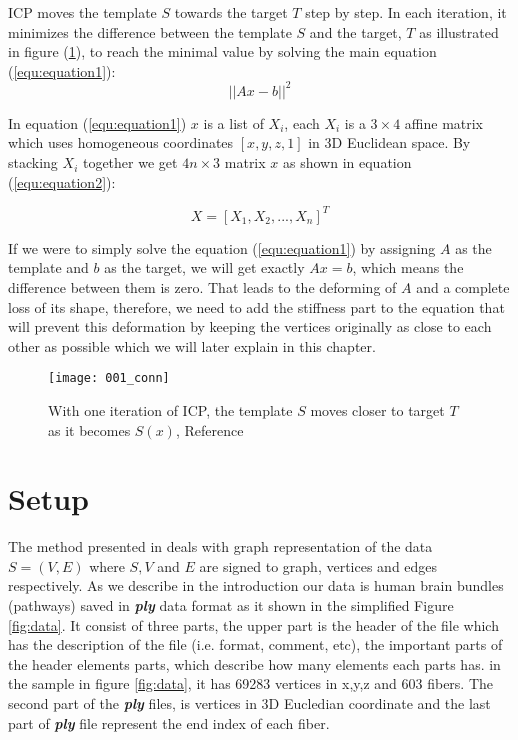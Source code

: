 \documentclass[../structure.tex]{subfiles}
\begin{document}
\hspace{2em}ICP moves the template $S$ towards the target $T$ step by step. In each iteration, it minimizes the difference between the template $S$ and the target, $T$ as illustrated in figure (\ref{fig:figure1}), to reach the minimal value by solving the main equation (\ref{equ:equation1}):
\begin{equation}
\label{equ:equation1}
||Ax-b||^2
\end{equation}

\hspace{2em}In equation (\ref{equ:equation1}) $x$ is a list of $X_i$, each $X_i$ is a $3\times4$ affine matrix which uses homogeneous coordinates $[x,y,z,1]$ in 3D Euclidean space. By stacking $X_i$ together we get $4n\times3$ matrix $x$ as shown in equation (\ref{equ:equation2}):

\begin{equation}
\label{equ:equation2}
X = [X_1, X_2, ... ,X_n]^T
\end{equation}

If we were to simply solve the equation (\ref{equ:equation1}) by assigning $A$ as the template and $b$ as the target, we will get exactly $Ax=b$, which means the difference between them is zero. That leads to the deforming of $A$ and a complete loss of its shape, therefore, we need to add the stiffness part to the equation that will prevent this deformation by keeping the vertices originally as close to each other as possible which we will later explain in this chapter.

\begin{figure}[h]
\centering
\texttt{[image: 001\_conn]}
\captionsetup{justification=centering}
\caption{With one iteration of ICP, the template $S$ moves closer to target $T$ as it becomes $S(x)$, Reference \cite{Amberg2007}}
\label{fig:figure1}
\end{figure}

\section{Setup}
The method presented in \cite{Amberg2007} deals with graph representation of the data $S=(V,E)$ where $S,V$ and $E$ are signed to  graph, vertices and edges respectively. As we describe in the introduction our data is human brain bundles (pathways) saved in \textbf{\textit{ply}} data format as it shown in the simplified Figure \ref{fig:data}. It consist of three parts, the upper part is the header of the file which has the description of the file (i.e. format, comment, etc), the important parts of the header elements parts, which describe how many elements each parts has. in the sample in figure \ref{fig:data}, it has 69283 vertices in x,y,z and 603 fibers. The second part of the \textbf{\textit{ply}} files, is vertices in 3D Eucledian coordinate and the last part of \textbf{\textit{ply}} file represent the end index of each fiber.
\end{document}

